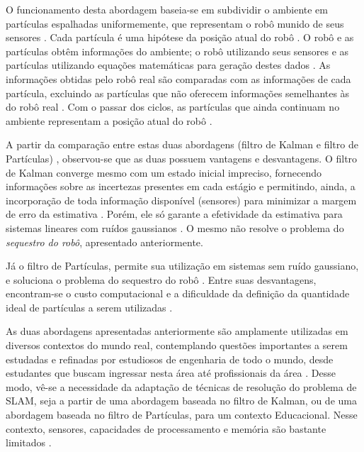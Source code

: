 O funcionamento desta abordagem baseia-se em subdividir o ambiente em partículas espalhadas uniformemente, que representam o robô munido de seus sensores \cite{comparacaoKalmanParticulas}. Cada partícula é uma hipótese da posição atual do robô \cite{dp-slam}. O robô e as partículas obtêm informações do ambiente; o robô utilizando seus sensores e as partículas utilizando equações matemáticas para geração destes dados \cite{comparacaoKalmanParticulas}. As informações obtidas pelo robô real são comparadas com as informações de cada partícula, excluindo as partículas que não oferecem informações semelhantes às do robô real \cite{comparacaoKalmanParticulas}. Com o passar dos ciclos, as partículas que ainda continuam no ambiente representam a posição atual do robô \cite{comparacaoKalmanParticulas}.

A partir da comparação entre estas duas abordagens (filtro de Kalman e filtro de Partículas) \cite{comparacaoKalmanParticulas}, observou-se que as duas possuem vantagens e desvantagens. O filtro de Kalman converge mesmo com um estado inicial impreciso, fornecendo informações sobre as incertezas presentes em cada estágio e permitindo, ainda, a incorporação de toda informação disponível (sensores) para minimizar a margem de erro da estimativa \cite{comparacaoKalmanParticulas}. Porém, ele só garante a efetividade da estimativa para sistemas lineares com ruídos gaussianos \cite{comparacaoKalmanParticulas}. O mesmo não resolve o problema do \textit{sequestro do robô}, apresentado anteriormente.

Já o filtro de Partículas, permite sua utilização em sistemas sem ruído gaussiano, e soluciona o problema do sequestro do robô \cite{filtroParticulasComLEGO}. Entre suas desvantagens, encontram-se o custo computacional e a dificuldade da definição da quantidade ideal de partículas a serem utilizadas \cite{comparacaoKalmanParticulas}.


As duas abordagens apresentadas anteriormente são amplamente utilizadas em diversos contextos do mundo real, contemplando questões importantes a serem estudadas e refinadas por estudiosos de engenharia de todo o mundo, desde estudantes que buscam ingressar nesta área até profissionais da área \cite{simpleRobotsIntroductionEng}. Desse modo, vê-se a necessidade da adaptação de técnicas de resolução do problema de SLAM, seja a partir de uma abordagem baseada no filtro de Kalman, ou de uma abordagem baseada no filtro de Partículas, para um contexto Educacional. Nesse contexto, sensores, capacidades de processamento e memória são bastante limitados \cite{roboticEducationBasedLego}.

